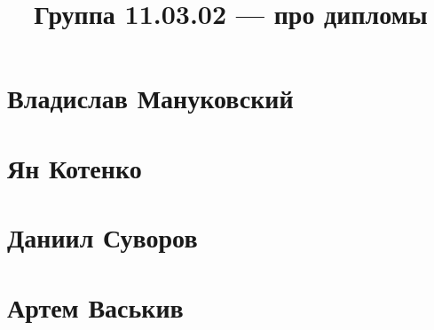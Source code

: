 \documentclass{article}
\title{Группа 11.03.02 --- про дипломы}
\begin{document}
\section*{Владислав Мануковский}

\section*{Ян Котенко}

\section*{Даниил Суворов}

\section*{Артем Васькив}
\end{document}
